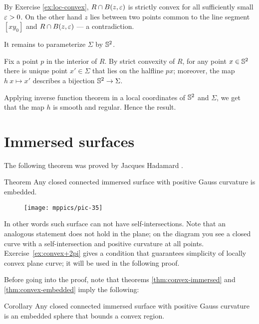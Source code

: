 By Exercise \ref{ex:loc-convex}, $R\cap B(z,\varepsilon)$ is strictly convex for all sufficiently small $\varepsilon>0$.
On the other hand $z$ lies between two points common to the line segment $[xy_0]$ and $R\cap B(z,\varepsilon)$ --- a contradiction.

It remains to parameterize $\Sigma$ by $\mathbb{S}^2$.

Fix a point $p$ in the interior of $R$.
By strict convexity of $R$, for any point $x\in \mathbb{S}^2$ there is unique point $x'\in \Sigma$ that lies on the halfline $px$;
moreover, the map $h\:x\mapsto x'$ describes a bijection $\mathbb{S}^2\to \Sigma$.

Applying inverse function theorem in a local coordinates of $\mathbb{S}^2$ and $\Sigma$,
we get that the map $h$ is smooth and regular.
Hence the result.
\qeds

\section{Immersed surfaces}

The following theorem was proved by Jacques Hadamard \cite{hadamard}. %

\begin{thm}{Theorem}\label{thm:convex-immersed}
Any closed connected immersed surface with positive Gauss curvature is embedded.
\end{thm}



\begin{wrapfigure}{r}{20 mm}
\vskip-0mm
\centering
\texttt{[image: mppics/pic-35]}
\vskip-0mm
\end{wrapfigure}

In other words such surface can not have self-intersections.
Note that an analogous statement does not hold in the plane;
on the diagram you see a closed curve with a self-intersection and positive curvature at all points.
Exercise~\ref{ex:convex+2pi} gives a condition that guarantees simplicity of locally convex plane curve;
it will be used in the following proof.



Before going into the proof, note that theorems \ref{thm:convex-immersed} and \ref{thm:convex-embedded}
imply the following:

\begin{thm}{Corollary}
Any closed connected immersed surface with positive Gauss curvature is an embedded sphere that bounds a convex region.
\end{thm}

